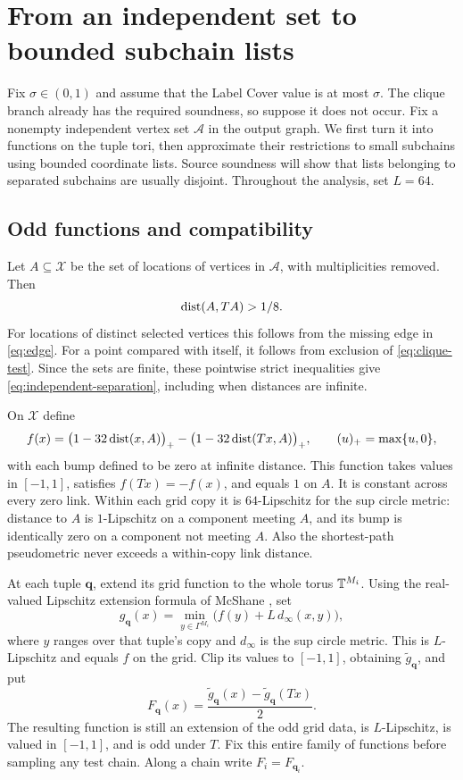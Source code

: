\section{From an independent set to bounded subchain lists}
\label{sec:lists}

Fix $\sigma\in(0,1)$ and assume that the Label Cover value is at most $\sigma$.
The clique branch already has the required soundness, so suppose
it does not occur. Fix a nonempty independent vertex set $\mathcal A$
in the output graph. We first turn it into functions on the tuple tori,
then approximate their restrictions to small subchains using bounded
coordinate lists. Source soundness will show that lists belonging to
separated subchains are usually disjoint. Throughout the analysis, set
$L=64$.

\subsection{Odd functions and compatibility}

Let $A\subseteq\mathscr X$ be the set of locations of vertices in
$\mathcal A$, with multiplicities removed. Then
\begin{equation}\label{eq:independent-separation}
 \operatorname{dist}(A,TA)>1/8.
\end{equation}
For locations of distinct selected vertices this follows from the missing
edge in \eqref{eq:edge}. For a point compared with itself, it follows
from exclusion of \eqref{eq:clique-test}. Since the sets are finite,
these pointwise strict inequalities give \eqref{eq:independent-separation},
including when distances are infinite.

On $\mathscr X$ define
\begin{equation}\label{eq:bumps}
 f(x)=\bigl(1-32\operatorname{dist}(x,A)\bigr)_+
       -\bigl(1-32\operatorname{dist}(Tx,A)\bigr)_+,
 \qquad (u)_+=\max\{u,0\},
\end{equation}
with each bump defined to be zero at infinite distance.
This function takes values in $[-1,1]$, satisfies $f(Tx)=-f(x)$,
and equals $1$ on $A$.
It is constant across every zero link.
Within each grid copy it is $64$-Lipschitz for the sup circle metric:
distance to $A$ is $1$-Lipschitz on a component meeting $A$, and its
bump is identically zero on a component not meeting $A$.
Also the shortest-path pseudometric never exceeds a within-copy
link distance.

At each tuple $\mathbf q$, extend its grid function to the whole
torus $\mathbb T^{M_i}$. Using the real-valued Lipschitz extension formula of McShane
\cite{McShane1934}, set
\[
 g_{\mathbf q}(x)=
 \min_{y\in\Gamma^{M_i}}
       \bigl(f(y)+L\,d_\infty(x,y)\bigr),
\]
where $y$ ranges over that tuple's copy and $d_\infty$ is the sup circle
metric. This is $L$-Lipschitz and equals $f$ on the grid.
Clip its values to $[-1,1]$, obtaining $\widetilde g_{\mathbf q}$, and put
\[
 F_{\mathbf q}(x)=
 \frac{\widetilde g_{\mathbf q}(x)
       -\widetilde g_{\mathbf q}(Tx)}2.
\]
The resulting function is still an extension of the odd grid data,
is $L$-Lipschitz, is valued in $[-1,1]$, and is odd under $T$.
Fix this entire family of functions before sampling any test chain.
Along a chain write $F_i=F_{\mathbf q_i}$.

